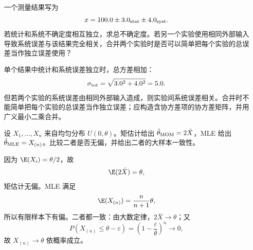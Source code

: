 \begin{question}
一个测量结果写为
\[
x=100.0\pm3.0_{\rm stat}\pm4.0_{\rm syst}.
\]
若统计和系统不确定度相互独立，求总不确定度。若另一个实验使用相同外部输入导致系统误差与该结果完全相关，合并两个实验时是否可以简单把每个实验的总误差当作独立误差使用？
\begin{solution}
单个结果中统计和系统误差独立时，总方差相加：
\[
\sigma_{\rm tot}=\sqrt{3.0^2+4.0^2}=5.0.
\]
但若两个实验的系统误差由相同外部输入造成，则实验间系统误差相关。合并时不能简单把每个实验的总误差当作独立误差；应构造含协方差项的协方差矩阵，并用广义最小二乘合并。
\end{solution}
\end{question}

\begin{question}
设 $X_1,\ldots,X_n$ 来自均匀分布 $U(0,\theta)$。矩估计给出 $\hat\theta_{\rm MOM}=2\bar X$，MLE 给出 $\hat\theta_{\rm MLE}=X_{(n)}$。比较二者是否无偏，并给出二者的大样本一致性。
\begin{solution}
因为 $\E(X_i)=\theta/2$，故
\[
\E(2\bar X)=\theta,
\]
矩估计无偏。MLE 满足
\[
\E(X_{(n)})=\frac n{n+1}\theta,
\]
所以有限样本下有偏。二者都一致：由大数定律，$2\bar X\to\theta$；又
\[
P(X_{(n)}\le\theta-\varepsilon)=\left(1-\frac\varepsilon\theta\right)^n\to0,
\]
故 $X_{(n)}\to\theta$ 依概率成立。
\end{solution}
\end{question}
